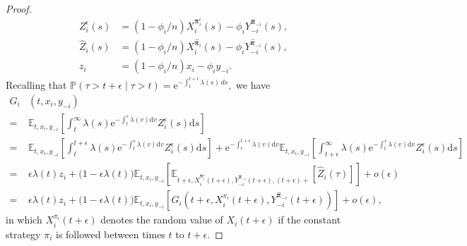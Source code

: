 \documentclass[11pt]{article}
\newcommand \drm {\mathrm{d}}
\newcommand \e {\mathrm{e}}
\numberwithin{equation}{section}
\newcommand{\bpi}{\boldsymbol{\pi}}
\providecommand{\smn}{{-}} %
\begin{document}
\begin{proof}
\begin{align}
Z_i^\epsilon (s)&= (1 - \phi_i/n) X_i^{\bm{\pi}^\epsilon_i}(s) - \phi_i Y^{\widehat{\bpi}_{\smn i}}_{\smn i}(s),\\
\widehat{Z}_i (s) &= (1 - \phi_i/n) X_i^{\widehat{\bm{\pi}}_i}(s) - \phi_i Y^{\widehat{\bpi}_{\smn i}}_{\smn i}(s),\\
z_i &= (1 - \phi_i/n)x_i - \phi_i y_{\smn i}.
\end{align}
Recalling that
		\(
		\mathbb{P}(\tau > t + \epsilon \mid \tau > t) = \e^{-\int_t^{t+\epsilon} \lambda(s)\, ds},
		\)
we have
		\begin{align*}
			G_i&(t,x_i,y_{\smn i})\\
			=&\mathbb{E}_{t,x_i,y_{\smn i}}\left[ \int_t^{\infty} \lambda(s) \e^{-\int_t^s\lambda(v)\drm v} Z_i^\epsilon(s)\drm s\right]\\
			=&\mathbb{E}_{t,x_i,y_{\smn i}}\left[\int_t^{t+\epsilon} \lambda(s)\e^{-\int_t^s\lambda(v)\drm v} Z_i^\epsilon(s)\drm s\right]+\e^{-\int_t^{t+\epsilon}\lambda(v)\drm v}\mathbb{E}_{t,x_i,y_{\smn i}}\left[\int_{t+\epsilon}^{\infty} \lambda(s) \e^{-\int_t^s\lambda(v)\drm v} Z_i^\epsilon(s)\drm s\right]\\
			=&\epsilon \lambda(t)z_i+\big(1-\epsilon \lambda(t)\big)\mathbb{E}_{t,x_i,y_{\smn i}}\left[\mathbb{E}_{t+\epsilon,X_i^{{\bm{\pi}}^\epsilon_i}(t+\epsilon),Y^{\widehat{\bpi}_{\smn i}}_{\smn i}(t+\epsilon),(t+\epsilon)+} \left[\widehat{Z}_i(\tau)\right]\right]+o(\epsilon)\\
			=&\epsilon \lambda(t)z_i+\big(1-\epsilon \lambda(t)\big)\mathbb{E}_{t,x_i,y_{\smn i}}\left[G_i\left(t+\epsilon,X^{\pi_i}_i(t+\epsilon),Y^{\widehat{\bpi}_{\smn i}}_{\smn i}(t+\epsilon)\right)\right]+o(\epsilon),
		\end{align*}
		in which \(X^{\pi_i}_i(t+\epsilon)\) denotes the random value of \(X_i(t+\epsilon)\) if the constant strategy \(\pi_i\) is followed between times \(t\) to \(t+\epsilon\).
		

\end{proof}
\end{document}
